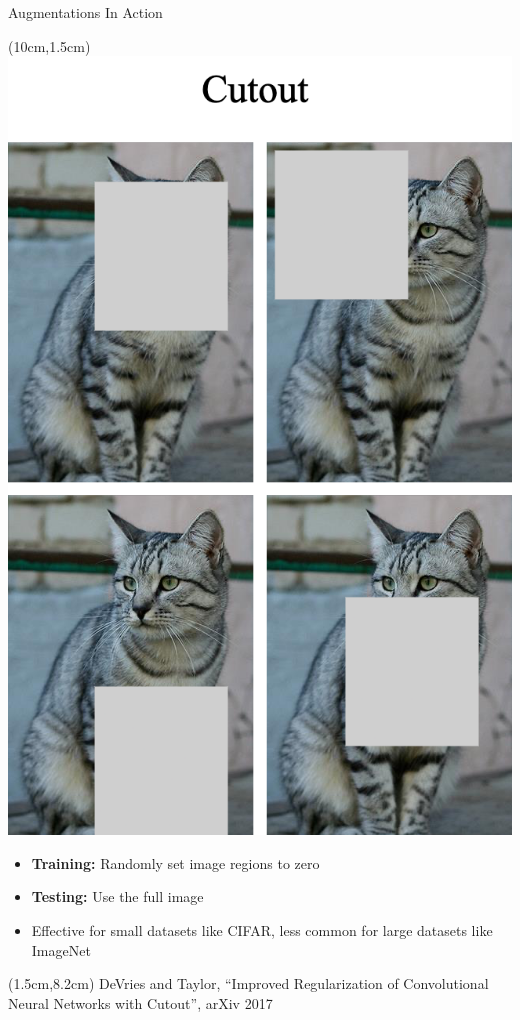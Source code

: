 \documentclass[serif, aspectratio=169]{beamer}
\begin{document}
\begin{frame}{Augmentations In Action}
	\begin{textblock*}{5cm}(10cm,1.5cm) %
		\includegraphics[keepaspectratio, scale=0.18]{pic/cutout}
	\end{textblock*}

	\begin{itemize}
		\item \textbf{Training:} Randomly set image regions to zero
		\item \textbf{Testing:} Use the full image
		\item Effective for  small datasets like CIFAR, less \newline common for large datasets like ImageNet
	\end{itemize}

	\begin{textblock*}{10cm}(1.5cm,8.2cm) %
		\tiny{DeVries and Taylor, ``Improved Regularization of Convolutional
		Neural Networks with Cutout'', arXiv 2017}
	\end{textblock*}
\end{frame}
\end{document}
